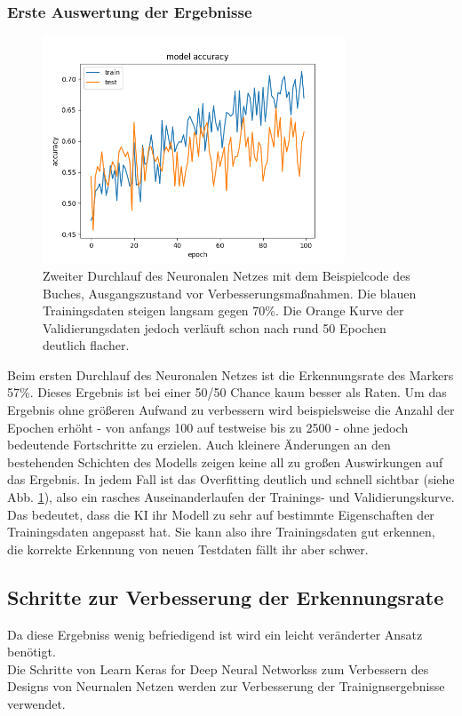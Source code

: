 \documentclass[conference]{IEEEtran}
\begin{document}
	\subsubsection{Erste Auswertung der Ergebnisse}	%

\begin{figure}[!h]
	\centering
	\includegraphics[width=9cm]{img/160x120:100@32_accuracy.png}
	\caption{Zweiter Durchlauf des Neuronalen Netzes mit dem Beispielcode
		des Buches, Ausgangszustand vor Verbesserungsmaßnahmen. Die 
		blauen Trainingsdaten steigen langsam gegen 
		70\%. Die Orange Kurve der Validierungsdaten jedoch verläuft schon 
		nach rund 50 Epochen deutlich flacher. }
	\label{Initiales Ergebnis}
\end{figure}
Beim ersten Durchlauf des Neuronalen Netzes ist die Erkennungsrate des 
Markers 57\%. Dieses Ergebnis ist bei einer 50/50 Chance kaum besser als 
Raten. 
Um das Ergebnis ohne größeren Aufwand zu verbessern wird beispielsweise die Anzahl der Epochen erhöht - von anfangs 100 auf testweise bis zu 2500 - ohne jedoch bedeutende Fortschritte zu erzielen.
Auch kleinere Änderungen an den bestehenden Schichten des Modells zeigen keine all zu großen Auswirkungen auf das Ergebnis.
In jedem Fall ist das Overfitting deutlich und schnell sichtbar (siehe Abb. \ref{Initiales Ergebnis}), also ein rasches Auseinanderlaufen der Trainings- und Validierungskurve.
Das bedeutet, dass die KI ihr Modell zu sehr auf bestimmte Eigenschaften der Trainingsdaten angepasst hat.
Sie kann also ihre Trainingsdaten gut erkennen, die korrekte Erkennung von neuen Testdaten fällt ihr aber schwer.

	\subsection{Schritte zur Verbesserung der Erkennungsrate} %
Da diese Ergebniss wenig befriedigend ist wird ein leicht veränderter Ansatz 
benötigt. \\
	Die Schritte von \glqq Learn Keras for Deep Neural Networkss\grqq \cite{moolayil2019learn} zum Verbessern des Designs von Neurnalen Netzen werden zur Verbesserung der Trainignsergebnisse verwendet. 
	
\end{document}
